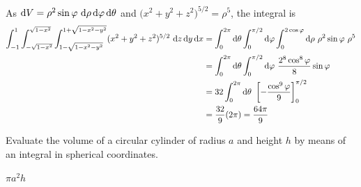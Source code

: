 \begin{solution}
 
As $\dee{V} = \rho^2\sin\varphi\ \dee{\rho}\,\dee{\varphi}\,\dee{\theta}$
and $\big(x^2+y^2+z^2\big)^{5/2}=\rho^5$, the integral is
\begin{align*}
\int_{-1}^1 \int_{-\sqrt{1-x^2}}^{\sqrt{1-x^2}}  
           \int_{1-\sqrt{1-x^2-y^2}}^{1+\sqrt{1-x^2-y^2}}
   (x^2+y^2+z^2)^{5/2}  \ \dee{z}\,\dee{y}\,\dee{x}
&=\int_0^{2\pi}\dee{\theta}\int_0^{\pi/2}\dee{\varphi}
       \int_0^{2\cos\varphi}\dee{\rho}\ \rho^2\sin\varphi
        \ \rho^5 \\
&=\int_0^{2\pi}\dee{\theta}\int_0^{\pi/2}\dee{\varphi}
       \ \frac{2^8\cos^8\varphi}{8}\sin\varphi \\
&=32\int_0^{2\pi}\dee{\theta}\ \left[-\frac{\cos^9\varphi}{9}\right]_0^{\pi/2}
  \\
&=\frac{32}{9}(2\pi)
=\frac{64\pi}{9}
\end{align*}
\end{solution}

\begin{question}
Evaluate the volume of a circular cylinder of radius $a$ and height $h$ by means of an integral in spherical coordinates.
\end{question}

%

\begin{answer}
$\pi a^2h$
\end{answer}

